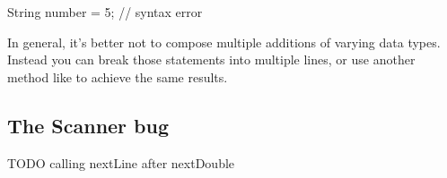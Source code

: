 \begin{code}
     String number = 5;  // syntax error
\end{code}

In general, it's better not to compose multiple additions of varying data types.
Instead you can break those statements into multiple lines, or use another method like  to achieve the same results.

\subsection{The Scanner bug}

TODO calling nextLine after nextDouble
